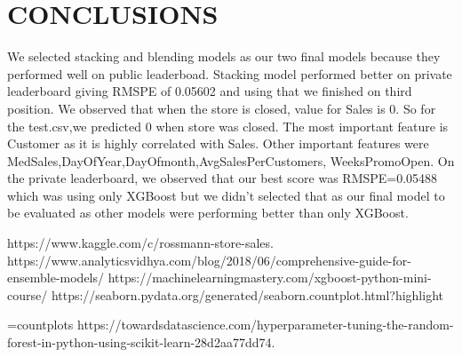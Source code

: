 \documentclass[letterpaper, 10 pt, conference]{ieeeconf}  %
\begin{document}
\section{CONCLUSIONS}

We selected stacking and blending models as our two final models because they performed well on public leaderboad. Stacking model performed better on private leaderboard giving RMSPE of 0.05602 and using that we finished on third position. We observed that when the store is closed, value for Sales is 0. So for the test.csv,we predicted 0 when store was closed. The most important feature is Customer as it is highly correlated with Sales. Other important features were MedSales,DayOfYear,DayOfmonth,AvgSalesPerCustomers,
WeeksPromoOpen. On the private leaderboard, we observed
that our best score was RMSPE=0.05488 which was using only XGBoost but we didn't selected that as our final model to be evaluated as other models were performing better than only XGBoost.

\addtolength{\textheight}{-12cm}   %












\begin{thebibliography}{99}

 https://www.kaggle.com/c/rossmann-store-sales.
 https://www.analyticsvidhya.com/blog/2018/06/comprehensive-guide-for-ensemble-models/
 https://machinelearningmastery.com/xgboost-python-mini-course/
 https://seaborn.pydata.org/generated/seaborn.countplot.html?highlight

=countplots
 https://towardsdatascience.com/hyperparameter-tuning-the-random-forest-in-python-using-scikit-learn-28d2aa77dd74.


\end{thebibliography}
\end{document}
